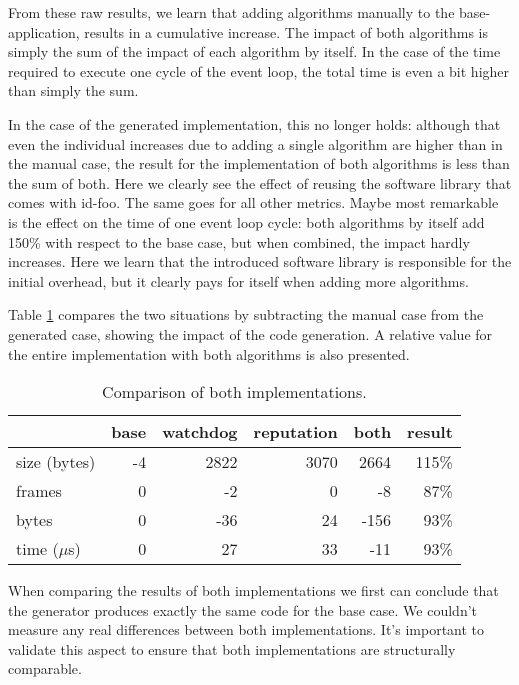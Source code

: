 \documentclass[conference]{IEEEtran}
\newcommand{\NAME}{id-foo\xspace}
\begin{document}
From these raw results, we learn that adding algorithms manually to the
base-application, results in a cumulative increase. The impact of both
algorithms is simply the sum of the impact of each algorithm by itself. In the
case of the time required to execute one cycle of the event loop, the total
time is even a bit higher than simply the sum.

In the case of the generated implementation, this no longer holds: although
that even the individual increases due to adding a single algorithm are higher
than in the manual case, the result for the implementation of both algorithms
is less than the sum of both. Here we clearly see the effect of reusing the
software library that comes with \NAME. The same goes for all other metrics.
Maybe most remarkable is the effect on the time of one event loop cycle: both
algorithms by itself add 150\% with respect to the base case, but when
combined, the impact hardly increases. Here we learn that the introduced
software library is responsible for the initial overhead, but it clearly pays
for itself when adding more algorithms.

Table \ref{tbl:summary} compares the two situations by subtracting the manual
case from the generated case, showing the impact of the code generation. A
relative value for the entire implementation with both algorithms is also
presented.

\begin{table}[H]
  \centering
  \begin{tabular}{lrrrrr}
  \hline
                & base & watchdog & reputation & both  & result \\
  \hline
  size (bytes)  & -4    & 2822     & 3070       & 2664  & 115\%  \\
  frames        & 0     & -2       & 0          & -8    & 87\%   \\
  bytes         & 0     & -36      & 24         & -156  & 93\%   \\
  time ($\mu$s) & 0     & 27       & 33         & -11   & 93\%   \\
  \hline
  \end{tabular}
  \caption{Comparison of both implementations.}
  \label{tbl:summary}
\end{table}

When comparing the results of both implementations we first can conclude that
the generator produces exactly the same code for the base case. We couldn't
measure any real differences between both implementations. It's important to
validate this aspect to ensure that both implementations are structurally
comparable.
\end{document}
